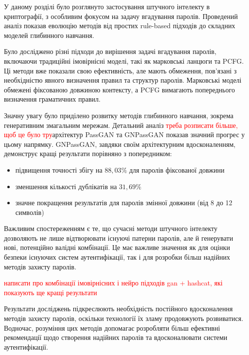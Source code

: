 \chapconclude{\ref{chap:review}}

У даному розділі було розглянуто застосування штучного інтелекту в криптографії, з особливим фокусом на задачу вгадування паролів. Проведений аналіз показав еволюцію методів від простих rule-based підходів до складних моделей глибинного навчання.

Було досліджено різні підходи до вирішення задачі вгадування паролів, включаючи традиційні імовірнісні моделі, такі як марковські ланцюги та PCFG. Ці методи вже показали свою ефективність, але мають обмеження, пов'язані з необхідністю явного визначення правил та структур паролів. Марковські моделі обмежені фіксованою довжиною контексту, а PCFG вимагають попереднього визначення граматичних правил.

Значну увагу було приділено розвитку методів глибинного навчання, зокрема генеративним змагальним мережам. Детальний аналіз \textcolor{red}{треба розписати більше, щоб це було тру}архітектур PassGAN та GNPassGAN показав значний прогрес у цьому напрямку. GNPassGAN, завдяки своїм архітектурним вдосконаленням, демонструє кращі результати порівняно з попередником:
\begin{itemize}
    \item підвищення точності збігу на \(88,03\%\) для паролів фіксованої довжини  
    \item зменшення кількості дублікатів на \(31,69\%\)
    \item значне покращення результатів для паролів змінної довжини (від 8 до 12 символів) 
\end{itemize}

Важливим спостереженням є те, що сучасні методи штучного інтелекту дозволяють не лише відтворювати існуючі патерни паролів, але й генерувати нові, потенційно валідні комбінації. Це має важливе значення як для оцінки безпеки існуючих систем аутентифікації, так і для розробки більш надійних методів захисту паролів.

\textcolor{red}{написати про комбінації імовірнісних і нейро підходів gan + hashcat, які показують ще кращі результати}

Результати досліджень підкреслюють необхідність постійного вдосконалення методів захисту паролів, оскільки технології їх зламу продовжують розвиватися. Водночас, розуміння цих методів допомагає розробляти більш ефективні рекомендації щодо створення надійних паролів та вдосконалювати системи аутентифікації.